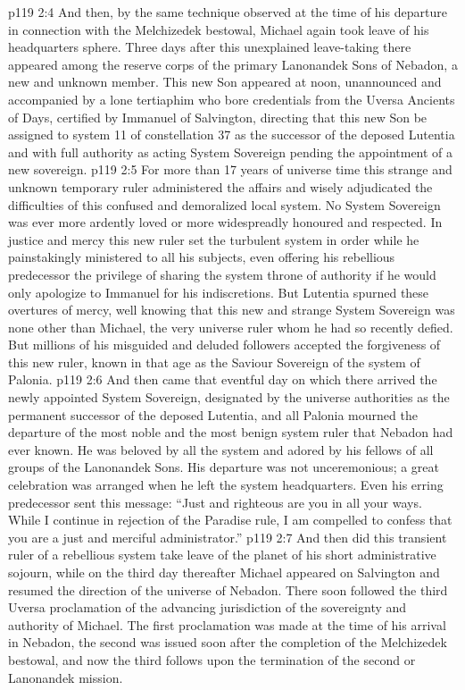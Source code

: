 \vs p119 2:4 And then, by the same technique observed at the time of his departure in connection with the Melchizedek bestowal, Michael again took leave of his headquarters sphere. Three days after this unexplained leave\hyp{}taking there appeared among the reserve corps of the primary Lanonandek Sons of Nebadon, a new and unknown member. This new Son appeared at noon, unannounced and accompanied by a lone tertiaphim who bore credentials from the Uversa Ancients of Days, certified by Immanuel of Salvington, directing that this new Son be assigned to system 11 of constellation 37 as the successor of the deposed Lutentia and with full authority as acting System Sovereign pending the appointment of a new sovereign.
\vs p119 2:5 For more than 17 years of universe time this strange and unknown temporary ruler administered the affairs and wisely adjudicated the difficulties of this confused and demoralized local system. No System Sovereign was ever more ardently loved or more widespreadly honoured and respected. In justice and mercy this new ruler set the turbulent system in order while he painstakingly ministered to all his subjects, even offering his rebellious predecessor the privilege of sharing the system throne of authority if he would only apologize to Immanuel for his indiscretions. But Lutentia spurned these overtures of mercy, well knowing that this new and strange System Sovereign was none other than Michael, the very universe ruler whom he had so recently defied. But millions of his misguided and deluded followers accepted the forgiveness of this new ruler, known in that age as the Saviour Sovereign of the system of Palonia.
\vs p119 2:6 \pc And then came that eventful day on which there arrived the newly appointed System Sovereign, designated by the universe authorities as the permanent successor of the deposed Lutentia, and all Palonia mourned the departure of the most noble and the most benign system ruler that Nebadon had ever known. He was beloved by all the system and adored by his fellows of all groups of the Lanonandek Sons. His departure was not unceremonious; a great celebration was arranged when he left the system headquarters. Even his erring predecessor sent this message: “Just and righteous are you in all your ways. While I continue in rejection of the Paradise rule, I am compelled to confess that you are a just and merciful administrator.”
\vs p119 2:7 And then did this transient ruler of a rebellious system take leave of the planet of his short administrative sojourn, while on the third day thereafter Michael appeared on Salvington and resumed the direction of the universe of Nebadon. There soon followed the third Uversa proclamation of the advancing jurisdiction of the sovereignty and authority of Michael. The first proclamation was made at the time of his arrival in Nebadon, the second was issued soon after the completion of the Melchizedek bestowal, and now the third follows upon the termination of the second or Lanonandek mission.
